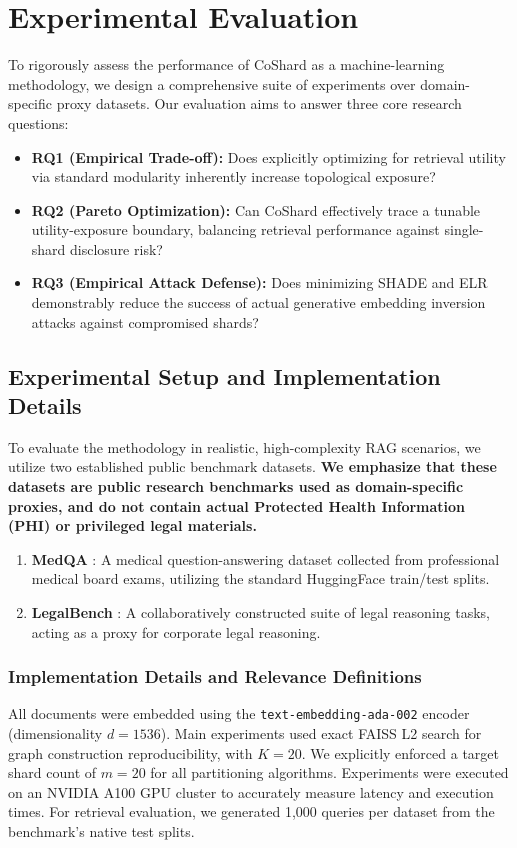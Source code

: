 \section{Experimental Evaluation}
\label{sec:experiments}

To rigorously assess the performance of CoShard as a machine-learning methodology, we design a comprehensive suite of experiments over domain-specific proxy datasets. Our evaluation aims to answer three core research questions:
\begin{itemize}
    \item \textbf{RQ1 (Empirical Trade-off):} Does explicitly optimizing for retrieval utility via standard modularity inherently increase topological exposure?
    \item \textbf{RQ2 (Pareto Optimization):} Can CoShard effectively trace a tunable utility-exposure boundary, balancing retrieval performance against single-shard disclosure risk?
    \item \textbf{RQ3 (Empirical Attack Defense):} Does minimizing SHADE and ELR demonstrably reduce the success of actual generative embedding inversion attacks against compromised shards?
\end{itemize}

\subsection{Experimental Setup and Implementation Details}
To evaluate the methodology in realistic, high-complexity RAG scenarios, we utilize two established public benchmark datasets. \textbf{We emphasize that these datasets are public research benchmarks used as domain-specific proxies, and do not contain actual Protected Health Information (PHI) or privileged legal materials.}

\begin{enumerate}
    \item \textbf{MedQA} \cite{jin2021medqa}: A medical question-answering dataset collected from professional medical board exams, utilizing the standard HuggingFace train/test splits.
    \item \textbf{LegalBench} \cite{guha2023legalbench}: A collaboratively constructed suite of legal reasoning tasks, acting as a proxy for corporate legal reasoning.
\end{enumerate}

\subsubsection{Implementation Details and Relevance Definitions}
All documents were embedded using the \texttt{text-embedding-ada-002} encoder (dimensionality $d=1536$). Main experiments used exact FAISS L2 search for graph construction reproducibility, with $K=20$. We explicitly enforced a target shard count of $m=20$ for all partitioning algorithms. Experiments were executed on an NVIDIA A100 GPU cluster to accurately measure latency and execution times. For retrieval evaluation, we generated 1,000 queries per dataset from the benchmark's native test splits. 

